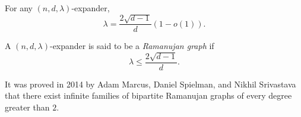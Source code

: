 			\begin{ftheo}
				For any $(n,d,\lambda)$-expander,
				\[ \lambda = \frac{2\sqrt{d-1}}{d}(1 - o(1)). \]
			\end{ftheo}

			\begin{fdef}
				A $(n,d,\lambda)$-expander is said to be a \emph{Ramanujan graph} if
				\[ \lambda \le \frac{2\sqrt{d-1}}{d}. \]
			\end{fdef}

			It was proved in 2014 by Adam Marcus, Daniel Spielman, and Nikhil Srivastava that there exist infinite families of bipartite Ramanujan graphs of every degree greater than $2$.